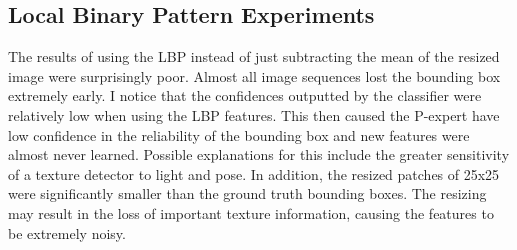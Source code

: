 \documentclass[10pt,twocolumn,letterpaper]{article}
\begin{document}
\subsection{Local Binary Pattern Experiments}
The results of using the LBP instead of just subtracting the mean of the resized image were surprisingly poor. Almost all image sequences lost the bounding box extremely early. I notice that the confidences outputted by the classifier were relatively low when using the LBP features. This then caused the P-expert have low confidence in the reliability of the bounding box and new features were almost never learned. Possible explanations for this include the greater sensitivity of a texture detector to light and pose. In addition, the resized patches of 25x25 were significantly smaller than the ground truth bounding boxes. The resizing may result in the loss of important texture information, causing the features to be extremely noisy.



\nocite{*}
\end{document}
